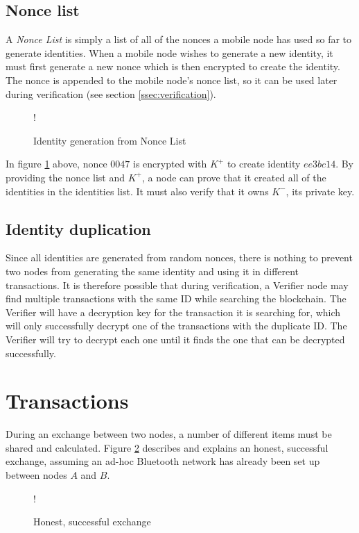 \subsection{Nonce list} \label{sssec:nonce_list}
A \textit{Nonce List} is simply a list of all of the nonces a mobile node has used so far to generate identities. When a mobile node wishes to generate a new identity, it must first generate a new nonce which is then encrypted to create the identity. The nonce is appended to the mobile node's nonce list, so it can be used later during verification (see section \ref{ssec:verification}).

\begin{figure}[H]
\resizebox {\columnwidth} {!} {}
\caption{Identity generation from Nonce List}
\label{fig:nonce_list}
\end{figure}

In figure \ref{fig:nonce_list} above, nonce $0047$ is encrypted with $K^+$ to create identity $ee3bc14$. By providing the nonce list and $K^+$, a node can prove that it created all of the identities in the identities list. It must also verify that it owns $K^-$, its private key.

\subsection{Identity duplication}
Since all identities are generated from random nonces, there is nothing to prevent two nodes from generating the same identity and using it in different transactions. It is therefore possible that during verification, a Verifier node may find multiple transactions with the same ID while searching the blockchain. The Verifier will have a decryption key for the transaction it is searching for, which will only successfully decrypt one of the transactions with the duplicate ID. The Verifier will try to decrypt each one until it finds the one that can be decrypted successfully.

\newpage
\section{Transactions} \label{sec:transactions}
During an exchange between two nodes, a number of different items must be shared and calculated. Figure \ref{fig:transaction} describes and explains an honest, successful exchange, assuming an ad-hoc Bluetooth network has already been set up between nodes $A$ and $B$.

\begin{figure}[H]
\begin{center}
 {!} {}
\caption{Honest, successful exchange}
\label{fig:transaction}
\end{center}
\end{figure}

